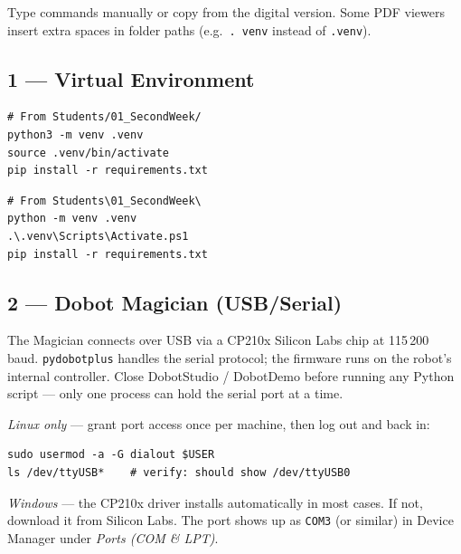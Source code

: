 \documentclass[11pt,a4paper]{article}
\begin{document}
\begin{tcolorbox}[notebox, title={Note: Avoid PDF Copy-Paste for Commands}]
Type commands manually or copy from the digital version. Some PDF viewers insert
extra spaces in folder paths (e.g.\ \texttt{.\ venv} instead of \texttt{.venv}).
\end{tcolorbox}

\subsection*{1 --- Virtual Environment}

\begin{tcolorbox}[setupbox, title={Linux / macOS}]
\begin{lstlisting}[style=code]
# From Students/01_SecondWeek/
python3 -m venv .venv
source .venv/bin/activate
pip install -r requirements.txt
\end{lstlisting}
\end{tcolorbox}

\begin{tcolorbox}[setupbox, title={Windows (PowerShell)}]
\begin{lstlisting}[style=code]
# From Students\01_SecondWeek\
python -m venv .venv
.\.venv\Scripts\Activate.ps1
pip install -r requirements.txt
\end{lstlisting}
\end{tcolorbox}

\subsection*{2 --- Dobot Magician (USB/Serial)}

The Magician connects over USB via a CP210x Silicon Labs chip at 115\,200 baud.
\texttt{pydobotplus} handles the serial protocol; the firmware runs on the robot's
internal controller. Close DobotStudio / DobotDemo before running any Python script
--- only one process can hold the serial port at a time.

\textit{Linux only} --- grant port access once per machine, then log out and back in:
\begin{lstlisting}[style=code]
sudo usermod -a -G dialout $USER
ls /dev/ttyUSB*    # verify: should show /dev/ttyUSB0
\end{lstlisting}

\textit{Windows} --- the CP210x driver installs automatically in most cases. If not,
download it from Silicon Labs. The port shows up as \texttt{COM3} (or similar) in
Device Manager under \textit{Ports (COM \& LPT)}.
\end{document}
